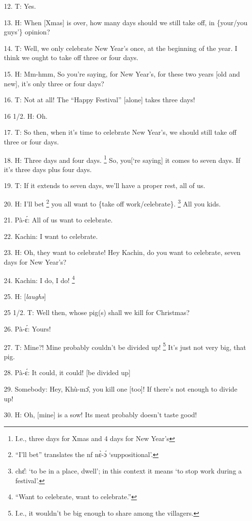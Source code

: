 12. T: Yes.

13. H: When [Xmas] is over, how many days should we still take off, in \{your/you
guys'\} opinion?

14. T: Well, we only celebrate New Year's once, at the beginning of the year.
I think we ought to take off three or four days.

15. H: Mm-hmm,  So you're saying, for New Year's, for these two years [old and
new], it's only three or four days?

16. T: Not at all!  The ``Happy Festival''  [alone] takes three days!

16 1/2. H: Oh.

17. T: So then, when it's time to celebrate New Year's, we should still take off
three or four days.

18. H: Three days and four days. \footnote{I.e., three days for Xmas and 4 days for New Year's} So, you[`re saying] it comes to seven days.
If it's three days plus four days.

19. T: If it extends to seven days, we'll have a proper rest, all of us.

20. H: I'll bet \footnote{``I'll bet'' translates the nf nɛ̀-ɔ́ `suppositional'.} you all want to \{take off work/celebrate\}. \footnote{chɛ̂: `to be in a place, dwell'; in this context it means `to stop work during a festival'.}  All you kids.

21. Pà-ɛ́: All of us want to celebrate.

22. Kachin: I want to celebrate.

23. H: Oh, they want to celebrate!  Hey Kachin, do you want to celebrate, seven
days for New Year's?

24. Kachin: I do, I do! \footnote{``Want to celebrate, want to celebrate.''}

25. H: [\textit{laughs}]

25 1/2. T: Well then, whose pig(s) shall we kill for Christmas?

26. Pà-ɛ́: Yours!

27. T: Mine?!  Mine probably couldn't be divided up! \footnote{I.e., it wouldn't be big enough to share among the villagers.}  It's just not very big,
that pig.

28. Pà-ɛ́: It could, it could! [be divided up]

29. Somebody: Hey, Khù-mɔ̂, you kill one [too]!  If there's not enough to divide
up!

30. H: Oh, [mine] is a sow!  Its meat probably doesn't taste good!

